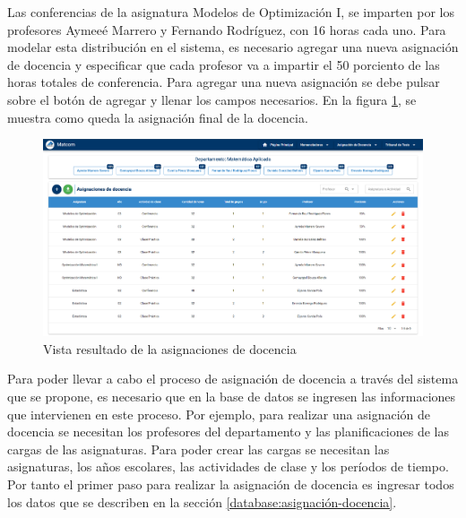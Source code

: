 Las conferencias de la asignatura Modelos de Optimización I, se imparten por los profesores 
Aymeeé Marrero y Fernando Rodríguez, con 16 horas cada uno.
Para modelar esta distribución en el sistema, es necesario agregar una 
nueva asignación de docencia y especificar que cada profesor va a impartir el 50 porciento 
de las horas totales de conferencia. Para agregar una nueva asignación se debe pulsar sobre el 
botón de agregar y llenar los campos necesarios. En la figura
\ref{img-ta-result}, se muestra como queda
la asignación final de la docencia. 

\begin{figure}[H]
    \includegraphics[scale=0.3]{Graphics/Implementation/Docencia/AD-result.png}
    \caption{Vista resultado de la asignaciones de docencia}
    \label{img-ta-result}
\end{figure}


Para poder llevar a cabo el proceso de asignación de docencia a través del sistema 
que se propone, es necesario que en la base de datos se ingresen las informaciones 
que intervienen en este proceso. Por ejemplo, para realizar una asignación de docencia se necesitan 
los profesores del departamento
y las planificaciones de las cargas de las asignaturas. Para poder crear las cargas  
se necesitan las asignaturas, los años escolares, las actividades de clase y los períodos de tiempo.
Por tanto el primer paso para realizar la asignación de docencia es ingresar todos los datos que 
se describen en la sección \ref{database:asignación-docencia}.









